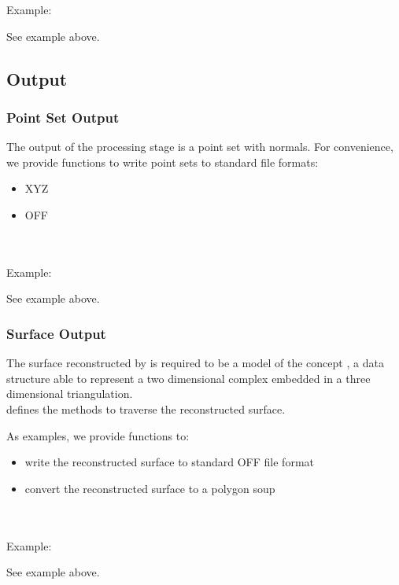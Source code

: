 Example:

See  example above.


\subsection{Output}

\subsubsection{Point Set Output}

The output of the processing stage is a point set with normals.
For convenience, we provide functions to write point sets to standard file formats:

\begin{itemize}
\item XYZ
\item OFF
\end{itemize}

  \\
  \\

Example:

See  example above.


\subsubsection{Surface Output}

The surface reconstructed by 
is required to be a model of the concept
,
a data structure able to represent a two dimensional
complex embedded in a three dimensional triangulation. \\
 defines the methods to traverse the reconstructed surface.

As examples, we provide functions to:

\begin{itemize}
\item write the reconstructed surface to standard OFF file format
\item convert the reconstructed surface to a polygon soup
\end{itemize}

  \\
  \\

Example:

See  example above.






